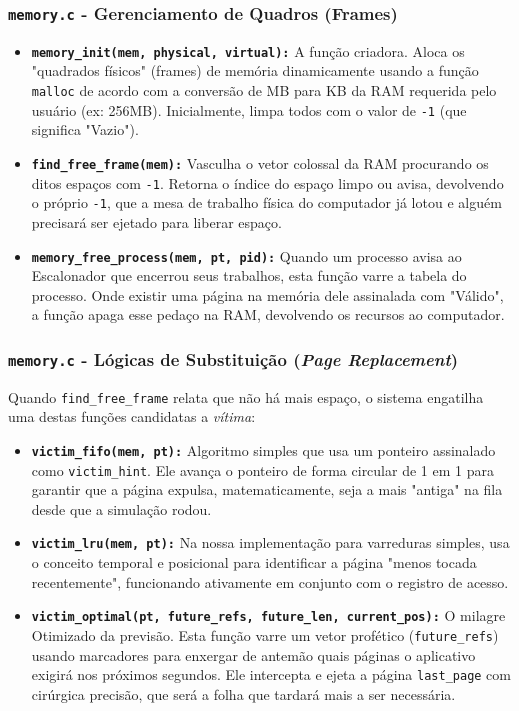 \documentclass[12pt,a4paper]{article}
\begin{document}
\begin{itemize}
{\subsubsection{\texttt{memory.c} - Gerenciamento de Quadros (Frames)}
\begin{itemize}
    \item \textbf{\texttt{memory\_init(mem, physical, virtual):}} A função criadora. Aloca os "quadrados físicos" (frames) de memória dinamicamente usando a função \texttt{malloc} de acordo com a conversão de MB para KB da RAM requerida pelo usuário (ex: 256MB). Inicialmente, limpa todos com o valor de \texttt{-1} (que significa "Vazio").
    \item \textbf{\texttt{find\_free\_frame(mem):}} Vasculha o vetor colossal da RAM procurando os ditos espaços com \texttt{-1}. Retorna o índice do espaço limpo ou avisa, devolvendo o próprio \texttt{-1}, que a mesa de trabalho física do computador já lotou e alguém precisará ser ejetado para liberar espaço.
    \item \textbf{\texttt{memory\_free\_process(mem, pt, pid):}} Quando um processo avisa ao Escalonador que encerrou seus trabalhos, esta função varre a tabela do processo. Onde existir uma página na memória dele assinalada com "Válido", a função apaga esse pedaço na RAM, devolvendo os recursos ao computador.
\end{itemize}

\subsubsection{\texttt{memory.c} - Lógicas de Substituição (\textit{Page Replacement})}
Quando \texttt{find\_free\_frame} relata que não há mais espaço, o sistema engatilha uma destas funções candidatas a \textit{vítima}:
\begin{itemize}
    \item \textbf{\texttt{victim\_fifo(mem, pt):}} Algoritmo simples que usa um ponteiro assinalado como \texttt{victim\_hint}. Ele avança o ponteiro de forma circular de 1 em 1 para garantir que a página expulsa, matematicamente, seja a mais "antiga" na fila desde que a simulação rodou.
    \item \textbf{\texttt{victim\_lru(mem, pt):}} Na nossa implementação para varreduras simples, usa o conceito temporal e posicional para identificar a página "menos tocada recentemente", funcionando ativamente em conjunto com o registro de acesso.
    \item \textbf{\texttt{victim\_optimal(pt, future\_refs, future\_len, current\_pos):}} O milagre Otimizado da previsão. Esta função varre um vetor profético (\texttt{future\_refs}) usando marcadores para enxergar de antemão quais páginas o aplicativo exigirá nos próximos segundos. Ele intercepta e ejeta a página \texttt{last\_page} com cirúrgica precisão, que será a folha que tardará mais a ser necessária. 
\end{itemize}

}
\end{itemize}
\end{document}

